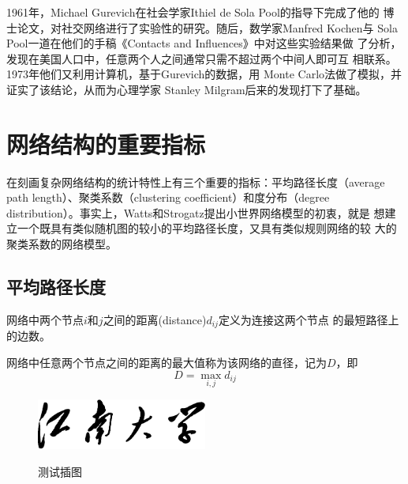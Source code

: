 \documentclass[bachelor,winfonts]{jnuthesis}
\begin{document}
    

    
    1961年，Michael Gurevich在社会学家Ithiel de Sola Pool的指导下完成了他的
    博士论文，对社交网络进行了实验性的研究。随后，数学家Manfred Kochen与
    Sola Pool一道在他们的手稿《Contacts and Influences》中对这些实验结果做
    了分析，发现在美国人口中，任意两个人之间通常只需不超过两个中间人即可互
    相联系\cite{pool1978}。1973年他们又利用计算机，基于Gurevich的数据，用
    Monte Carlo法做了模拟，并证实了该结论\cite{pool1978}，从而为心理学家
    Stanley Milgram后来的发现打下了基础。
    
    \section{网络结构的重要指标}
    
    在刻画复杂网络结构的统计特性上有三个重要的指标：平均路径长度（average
    path length）、聚类系数（clustering coefficient）和度分布（degree
    distribution）。事实上，Watts和Strogatz提出小世界网络模型的初衷，就是
    想建立一个既具有类似随机图的较小的平均路径长度，又具有类似规则网络的较
    大的聚类系数的网络模型。
    
    \subsection{平均路径长度}
    
    \begin{definition}[节点之间的距离]
        网络中两个节点$i$和$j$之间的距离(distance)$d_{ij}$定义为连接这两个节点
        的最短路径上的边数。
    \end{definition}
    
    \begin{definition}[直径]
        网络中任意两个节点之间的距离的最大值称为该网络的直径，记为$D$，即
        \begin{equation}\label{eq:dimension}
        D = \max_{i,j} d_{ij}
        \end{equation}
    \end{definition}
    
    
    \begin{figure}[htbp]
        \centering
        \includegraphics[width= 0.5\textwidth]{jnuname}\\
        \caption{测试插图}\label{fig:test3}
    \end{figure}
    
\end{document}
